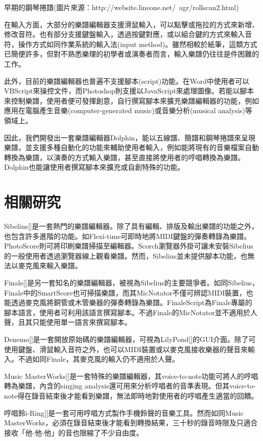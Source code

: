 \documentclass[12pt,a4paper,oneside]{report}
\begin{document}
早期的鋼琴捲譜(圖片來源：http://website.lineone.net/~agr/rollscan2.html)

在輸入方面，大部分的樂譜編輯器支援滑鼠輸入，可以點擊或拖拉的方式來新增、修改音符。也有部分支援鍵盤輸入，透過按鍵對應，或以組合鍵的方式來輸入音符，操作方式如同作業系統的輸入法(input method)。雖然相較於紙筆，這類方式已簡便許多，但對不熟悉樂理的初學者或演奏者而言，輸入樂譜仍往往是件困難的工作。

此外，目前的樂譜編輯器也普遍不支援腳本(script)功能。在Word中使用者可以VBScript來操控文件，而Photoshop則支援以JavaScript來處理圖像。若能以腳本來控制樂譜，使用者便可發揮創意，自行撰寫腳本來擴充樂譜編輯器的功能，例如應用在電腦產生音樂(computer-generated music)或音樂分析(musical analysis)等領域上。

因此，我們開發出一套樂譜編輯器Dolphin，能以五線譜、簡譜和鋼琴捲譜來呈現樂譜，並支援多種自動化的功能來輔助使用者輸入，例如能將現有的音樂檔案自動轉換為樂譜，以演奏的方式輸入樂譜，甚至直接將使用者的哼唱轉換為樂譜。Dolphin也能讓使用者撰寫腳本來擴充或自創特殊的功能。

\section{相關研究}

Sibelius[]是一套熱門的樂譜編輯器。除了具有編輯、排版及輸出樂譜的功能之外，也包含許多進階的功能。如Flexi-time可即時地將MIDI鍵盤的彈奏轉錄為樂譜。PhotoScore則可將印刷樂譜掃描至編輯器。Scorch瀏覽器外掛可讓未安裝Sibelius的一般使用者透過瀏覽器線上觀看樂譜。然而，Sibelius並未提供腳本功能，也無法以麥克風來輸入樂譜。

Finale[]是另一套知名的樂譜編輯器，被視為Sibelius的主要競爭者。如同Sibelius，Finale中的SmartScore也可掃描樂譜，而其MicNotator不僅可辨認MIDI裝置，也能透過麥克風將銅管或木管樂器的彈奏轉錄為樂譜。FinaleScript為Finale專屬的腳本語言，使用者可利用該語言撰寫腳本。不過Finale的MicNotator並不適用於人聲，且其只能使用單一語言來撰寫腳本。

Denemo[]是一套開放原始碼的樂譜編輯器，可視為LilyPond[]的GUI介面。除了可使用鍵盤、滑鼠輸入音符之外，也可以MIDI裝置或以麥克風接收樂器的聲音來輸入。不過如同Finale，其麥克風的輸入仍不適用於人聲。

Music MasterWorks[]是一套特殊的樂譜編輯器，其voice-to-note功能可將人的哼唱轉為樂譜，內含的singing analysis還可用來分析哼唱者的音準表現。但其voice-to-note得在錄音結束後才能看到樂譜，無法即時地對使用者的哼唱產生適當的回饋。

哼唱鈴i-Ring[]是一套可用哼唱方式製作手機鈴聲的音樂工具。然而如同Music MasterWorks，必須在錄音結束後才能看到轉換結果，三十秒的錄音時限及只適合接收「他-他-他」的音也限縮了不少自由度。
\end{document}
